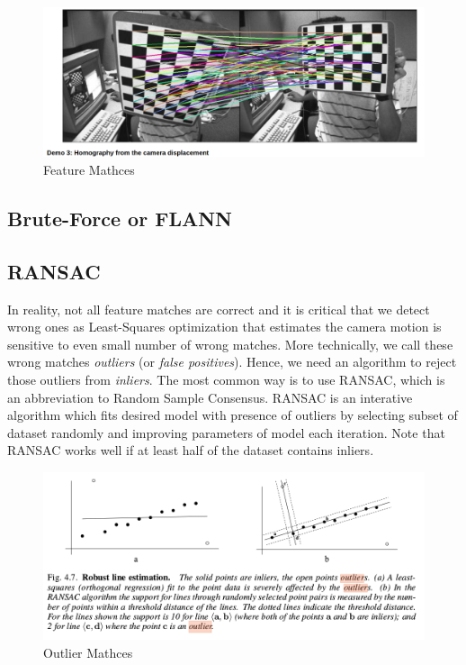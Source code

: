 \documentclass[a4paper]{report}
\numberwithin{figure}{section}
\begin{document}
\begin{figure}[H]
	\centering
	\includegraphics[width=\linewidth,natwidth=640,natheight=640]
  {fig/ref_imgs/feature_matchings.png}
  \caption{Feature Mathces}
	\label{fig:feature_matchings}
\end{figure}


\subsection{Brute-Force or FLANN} \label{sb_sc_}

\subsection{RANSAC} \label{sb_sc_ransac}

In reality, not all feature matches are correct and it is critical that we 
detect wrong ones as Least-Squares optimization that estimates the camera 
motion is sensitive to even small number of wrong matches. More technically,
we call these 
wrong matches \textit{outliers} (or \textit{false positives}). Hence, 
we need an algorithm to reject those outliers from \textit{inliers}. 
The most common way is to use RANSAC, which is an abbreviation to 
Random Sample Consensus. RANSAC is an interative algorithm which 
fits desired model with presence of outliers by selecting subset of dataset 
randomly and improving parameters of model each iteration. Note that 
RANSAC works 
well if at least half of the dataset contains inliers. 

\begin{figure}[H]
	\centering
	\includegraphics[width=\linewidth,natwidth=640,natheight=640]
  {fig/ref_imgs/line_ransac_outlier.png}
  \caption{Outlier Mathces}
	\label{fig:outlier_matches}
\end{figure}
\end{document}
